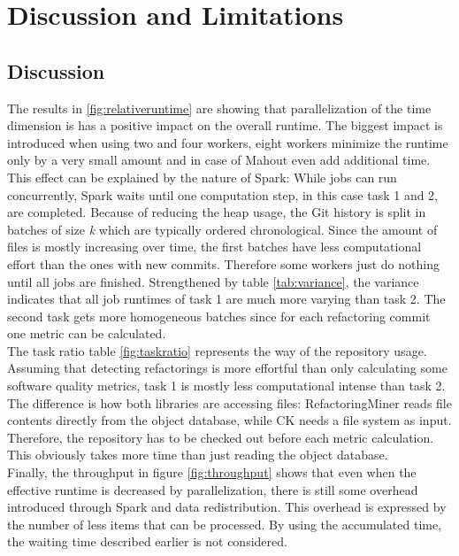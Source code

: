 
\section{Discussion and Limitations}
\label{sec:discussion}

\subsection{Discussion}
\label{sec:observations}
The results in \ref{fig:relativeruntime} are showing that parallelization of the time dimension is has a positive impact on the overall runtime. The biggest impact is introduced when using two and four workers, eight workers minimize the runtime only by a very small amount and in case of Mahout even add additional time. This effect can be explained by the nature of Spark: While jobs can run concurrently, Spark waits until one computation step, in this case task 1 and 2, are completed. Because of reducing the heap usage, the Git history is split in batches of size \emph{k} which are typically ordered chronological. Since the amount of files is mostly increasing over time, the first batches have less computational effort than the ones with new commits. Therefore some workers just do nothing until all jobs are finished. Strengthened by table \ref{tab:variance}, the variance indicates that all job runtimes of task 1 are much more varying than task 2. The second task gets more homogeneous batches since for each refactoring commit one metric can be calculated.\\
The task ratio table \ref{fig:taskratio} represents the way of the repository usage. Assuming that detecting refactorings is more effortful than only calculating some software quality metrics, task 1 is mostly less computational intense than task 2. The difference is how both libraries are accessing files: RefactoringMiner reads file contents directly from the object database, while CK needs a file system as input. Therefore, the repository has to be checked out before each metric calculation. This obviously takes more time than just reading the object database.\\
Finally, the throughput in figure \ref{fig:throughput} shows that even when the effective runtime is decreased by parallelization, there is still some overhead introduced through Spark and data redistribution. This overhead is expressed by the number of less items that can be processed. By using the accumulated time, the waiting time described earlier is not considered.

